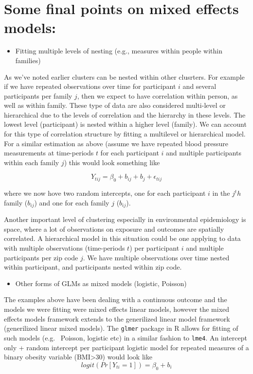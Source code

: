 \documentclass[
]{book}
\providecommand{\tightlist}{%
  \setlength{\itemsep}{0pt}\setlength{\parskip}{0pt}}
\begin{document}
\hypertarget{some-final-points-on-mixed-effects-models}{%
\section{Some final points on mixed effects models:}\label{some-final-points-on-mixed-effects-models}}

\begin{itemize}
\tightlist
\item
  Fitting multiple levels of nesting (e.g., measures within people within families)
\end{itemize}

As we've noted earlier clusters can be nested within other clusrters. For example
if we have repeated observations over time for participant \(i\) and several participants
per family \(j\), then we expect to have correlation within person, as well as within
family. These type of data are also considered multi-level or hierarchical due to
the levels of correlation and the hierarchy in these levels. The lowest level (participant)
is nested within a higher level (family). We can account for this type of correlation
structure by fitting a multilevel or hierarchical model. For a similar estimation
as above (assume we have repeated blood pressure measurements at time-periods \(t\)
for each participant \(i\) and multiple participants within each family \(j\)) this
would look something like

\[
Y_{tij} = \beta_{0} + b_{ij} + b_{j} + \epsilon_{tij} 
\]

where we now hove two random intercepts, one for each participant \(i\) in the \(j^th\)
family (\(b_{ij}\)) and one for each family \(j\) (\(b_{ij}\)).

Another important level of clustering especially in environmental epidemiology is
space, where a lot of observations on exposure and outcomes are spatially correlated.
A hierarchical model in this situation could be one applying to data with multiple
observations (time-periods \(t\)) per participant \(i\) and multiple participants per
zip code \(j\). We have multiple observations over time nested within participant,
and participants nested within zip code.

\begin{itemize}
\tightlist
\item
  Other forms of GLMs as mixed models (logistic, Poisson)
\end{itemize}

The examples above have been dealing with a continuous outcome and the models we
were fitting were mixed effects linear models, however the mixed effects models
framework extends to the generilized linear model framework (generilized linear
mixed models). The \texttt{glmer} package in R allows for fitting of such models (e.g.~
Poisson, logistic etc) in a similar fashion to \texttt{lme4}. An intercept only + random
intercept per participant logistic model for repeated measures of a binary obesity variable (BMI\textgreater30) would look like
\[
logit(Pr[Y_{ti}=1]) = \beta_{0} + b_{i} 
\]
\end{document}
